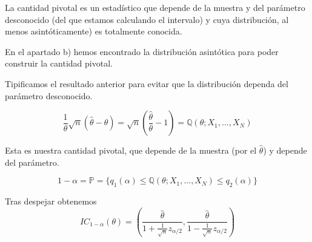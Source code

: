 \begin{problem}[5]
\spart
La cantidad pivotal es un estadístico que depende de la muestra y del parámetro desconocido (del que estamos calculando el intervalo) y cuya distribución, al menos asintóticamente) es totalmente conocida.

En el apartado b) hemos encontrado la distribución asintótica para poder construir la cantidad pivotal.

Tipificamos el resultado anterior para evitar que la distribución dependa del parámetro desconocido.

\[
\frac{1}{\theta} \sqrt{n}(\hat{\theta} - \theta)  = 
\sqrt{n} \left(\frac{\hat{\theta}}{\theta} - 1 \right) = \mathbb{Q}(\theta;X_1,...,X_N)
\]

Esta es nuestra cantidad pivotal, que depende de la muestra (por el $\hat{\theta}$) y depende del parámetro.

\[1-\alpha  = \mathbb{P} = \{q_1(\alpha) \leq \mathbb{Q}(\theta;X_1,...,X_N) \leq q_2 (\alpha)\}\]

Tras despejar obtenemos
\[
IC_{1-\alpha}(\theta) =
(\frac{\hat\theta}{1 + \frac{1}{\sqrt{n}} z_{\alpha/2}}, \frac{\hat\theta}{1 - \frac{1}{\sqrt{n}} z_{\alpha/2}})
\]
\end{problem}

